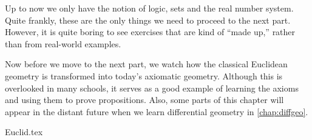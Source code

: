 \label{chap:basicgeo}

Up to now we only have the notion of
logic,
sets
and the real number system.
Quite frankly,
these are the only things we need
to proceed to the next part.
However,
it is quite boring to see exercises that are kind of ``made up,''
rather than from real-world examples.

Now before we move to the next part,
we watch how the classical Euclidean geometry
is transformed into today's axiomatic geometry.
Although this is overlooked in many schools,
it serves as a good example of
learning the axioms and using them to prove propositions.
Also, some parts of this chapter
will appear in the distant future
when we learn differential geometry in \cref{chap:diffgeo}.

{Euclid.tex}